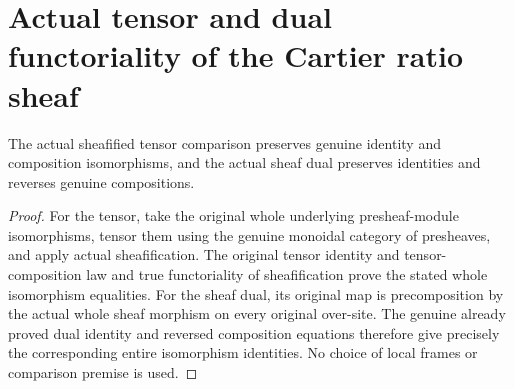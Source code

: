 \section{Actual tensor and dual functoriality of the Cartier ratio sheaf}
\begin{lemma}
\label{lem:cartier-actual-tensor-dual-functorial}
\leanok
{}
The actual sheafified tensor comparison preserves genuine identity and
composition isomorphisms, and the actual sheaf dual preserves identities
and reverses genuine compositions.
\end{lemma}
\begin{proof}
For the tensor, take the original whole underlying presheaf-module
isomorphisms, tensor them using the genuine monoidal category of
presheaves, and apply actual sheafification. The original tensor identity
and tensor-composition law and true functoriality of sheafification prove
the stated whole isomorphism equalities. For the sheaf dual, its original
map is precomposition by the actual whole sheaf morphism on every
original over-site. The genuine already proved dual identity and reversed
composition equations therefore give precisely the corresponding entire
isomorphism identities. No choice of local frames or comparison premise
is used.
\end{proof}
